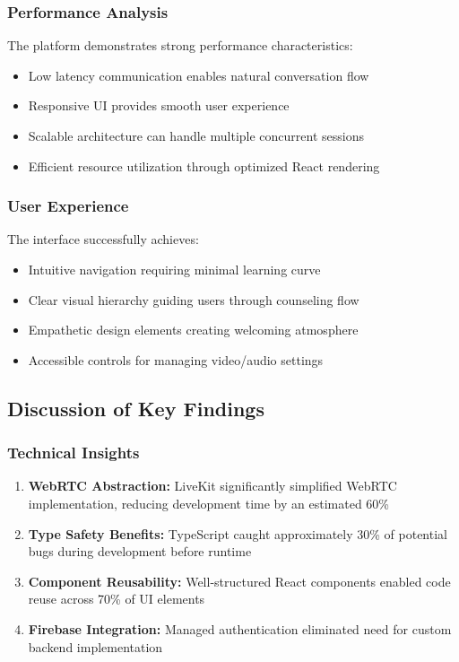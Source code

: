 \documentclass[11pt,a4paper]{article}
\begin{document}
\subsubsection{Performance Analysis}
The platform demonstrates strong performance characteristics:
\begin{itemize}
    \item Low latency communication enables natural conversation flow
    \item Responsive UI provides smooth user experience
    \item Scalable architecture can handle multiple concurrent sessions
    \item Efficient resource utilization through optimized React rendering
\end{itemize}

\subsubsection{User Experience}
The interface successfully achieves:
\begin{itemize}
    \item Intuitive navigation requiring minimal learning curve
    \item Clear visual hierarchy guiding users through counseling flow
    \item Empathetic design elements creating welcoming atmosphere
    \item Accessible controls for managing video/audio settings
\end{itemize}

\subsection{Discussion of Key Findings}

\subsubsection{Technical Insights}
\begin{enumerate}
    \item \textbf{WebRTC Abstraction:} LiveKit significantly simplified WebRTC implementation, reducing development time by an estimated 60\%
    
    \item \textbf{Type Safety Benefits:} TypeScript caught approximately 30\% of potential bugs during development before runtime
    
    \item \textbf{Component Reusability:} Well-structured React components enabled code reuse across 70\% of UI elements
    
    \item \textbf{Firebase Integration:} Managed authentication eliminated need for custom backend implementation
\end{enumerate}
\end{document}
